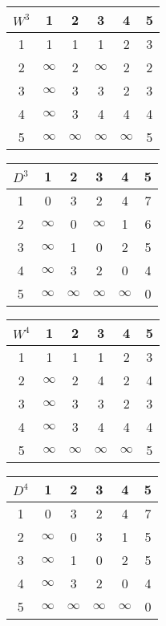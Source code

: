 \documentclass{article}
\begin{document}
	\begin{center}
		\begin{tabular}{c|ccccc}
			$W^3$ & 1 & 2 & 3 & 4 & 5 \\
			\hline
			1 & 1 & 1 & \cellcolor{blue!20}1 & 2 & 3 \\
			2 & $\infty$ & 2 & \cellcolor{blue!20}$\infty$ & 2 & 2 \\
			3 & \cellcolor{blue!20}$\infty$ & \cellcolor{blue!20}3 & \cellcolor{blue!20}3 & \cellcolor{blue!20}2 & \cellcolor{blue!20}3 \\
			4 & $\infty$ & 3 & \cellcolor{blue!20}4 & 4 & 4 \\
			5 & $\infty$ & $\infty$ & \cellcolor{blue!20}$\infty$ & $\infty$ & 5
		\end{tabular}
		\begin{tabular}{c|ccccc}
			$D^3$ & 1 & 2 & 3 & 4 & 5 \\
			\hline
			1 & 0 & 3 & \cellcolor{blue!20}2 & 4 & 7 \\
			2 & $\infty$ & 0 & \cellcolor{blue!20}$\infty$ & 1 & 6 \\
			3 & \cellcolor{blue!20}$\infty$ & \cellcolor{blue!20}1 & \cellcolor{blue!20}0 & \cellcolor{blue!20}2 & \cellcolor{blue!20}5 \\
			4 & $\infty$ & 3 & \cellcolor{blue!20}2 & 0 & 4 \\
			5 & $\infty$ & $\infty$ & \cellcolor{blue!20}$\infty$ & $\infty$ & 0
		\end{tabular}
	\end{center}
	\begin{center}
		\begin{tabular}{c|ccccc}
			$W^4$ & 1 & 2 & 3 & 4 & 5 \\
			\hline
			1 & 1 & 1 & 1 & \cellcolor{blue!20}2 & 3 \\
			2 & $\infty$ & 2 & 4 & \cellcolor{blue!20}2 & 4 \\
			3 & $\infty$ & 3 & 3 & \cellcolor{blue!20}2 & 3 \\
			4 & \cellcolor{blue!20}$\infty$ & \cellcolor{blue!20}3 & \cellcolor{blue!20}4 & \cellcolor{blue!20}4 & \cellcolor{blue!20}4 \\
			5 & $\infty$ & $\infty$ & $\infty$ & \cellcolor{blue!20}$\infty$ & 5
		\end{tabular}
		\begin{tabular}{c|ccccc}
			$D^4$ & 1 & 2 & 3 & 4 & 5 \\
			\hline
			1 & 0 & 3 & 2 & \cellcolor{blue!20}4 & 7 \\
			2 & $\infty$ & 0 & 3 & \cellcolor{blue!20}1 & 5 \\
			3 & $\infty$ & 1 & 0 & \cellcolor{blue!20}2 & 5 \\
			4 & \cellcolor{blue!20}$\infty$ & \cellcolor{blue!20}3 & \cellcolor{blue!20}2 & \cellcolor{blue!20}0 & \cellcolor{blue!20}4 \\
			5 & $\infty$ & $\infty$ & $\infty$ & \cellcolor{blue!20}$\infty$ & 0
		\end{tabular}
	\end{center}
\end{document}
